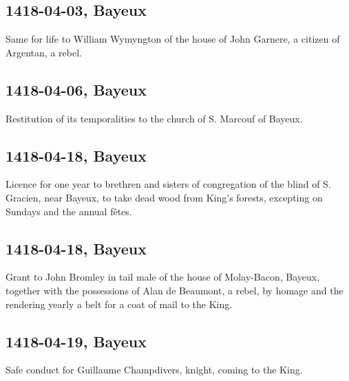 \documentclass[a4paper,12pt,twoside]{book}
\begin{document}
                
                \subsection{1418-04-03, Bayeux}
                
                
                     Same for life to William Wymyngton of the house of John Garnere, a citizen of Argentan, a rebel.
                  
                
                \subsection{1418-04-06, Bayeux}
                
                
                     Restitution of its temporalities to the church of S. Marcouf of Bayeux.
                  
                
                \subsection{1418-04-18, Bayeux}
                
                
                     Licence for one year to brethren and sisters of congregation of the blind of S. Gracien, near Bayeux, to take dead wood from King's forests, excepting on Sundays and the annual fêtes.
                  
                
                \subsection{1418-04-18, Bayeux}
                
                
                     Grant to John Bromley in tail male of the house of Molay-Bacon, Bayeux, together with the possessions of Alan de Beaumont, a rebel, by homage and the rendering yearly a belt for a coat of mail to the King.
                  
                
                \subsection{1418-04-19, Bayeux}
                
                
                     Safe conduct for Guillaume Champdivers, knight, coming to the King.
                  
\end{document}
